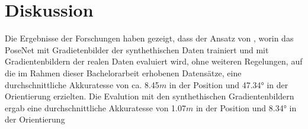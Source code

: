 
\section{Diskussion}
\label{sec:kapitel_5}
Die Ergebnisse der Forschungen haben gezeigt, dass der Ansatz von \citet{acharyaBIMPoseNetIndoorCamera2019}, worin das PoseNet mit Gradietenbilder der synthethischen Daten trainiert und mit Gradientenbildern der realen Daten evaluiert wird, ohne weiteren Regelungen, auf die im Rahmen dieser Bachelorarbeit erhobenen Datensätze, eine durchschnittliche Akkuratesse von ca. 8.45$m$ in der Position und 47.34° in der Orientierung erzielten. Die Evalution mit den synthethischen Gradientenbildern ergab eine durchschnittliche Akkuratesse von 1.07$m$ in der Position und 8.34° in der Orientierung
